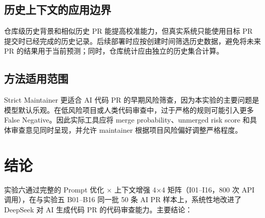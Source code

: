 \documentclass{experimentreport}
\begin{document}
\subsection{历史上下文的应用边界}

仓库级历史背景和相似历史 PR 能提高校准能力，但真实系统只能使用目标 PR 提交时已经完成的历史记录。后续部署时应按创建时间筛选历史数据，避免将未来 PR 的结果用于当前预测；同时，仓库统计应由独立的历史集合计算。

\subsection{方法适用范围}

Strict Maintainer 更适合 AI 代码 PR 的早期风险筛查，因为本实验的主要问题是模型默认乐观。在低风险项目或人类代码审查中，过于严格的规则可能引入更多 False Negative。因此实际工具应将 merge probability、unmerged risk score 和具体审查意见同时呈现，并允许 maintainer 根据项目风险偏好调整严格程度。

\section{结论}

实验六通过完整的 Prompt 优化 $\times$ 上下文增强 4$\times$4 矩阵（I01--I16，800 次 API 调用），在与实验五 B01--B16 同一批 50 条 AI PR 样本上，系统性地改进了 DeepSeek 对 AI 生成代码 PR 的代码审查能力。主要结论：
\end{document}
